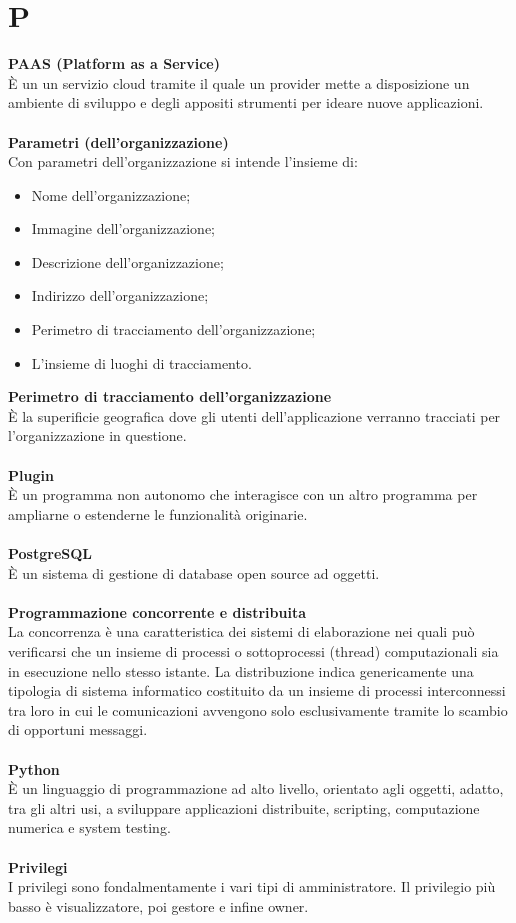 \section{P}
\textbf{PAAS (Platform as a Service)}\\
È un un servizio cloud tramite il quale un provider mette a disposizione un ambiente di sviluppo e degli appositi strumenti per ideare nuove applicazioni. \\ \\
\textbf{Parametri (dell'organizzazione)}\\
Con parametri dell'organizzazione si intende l'insieme di:
\begin{itemize}
    \item Nome dell'organizzazione;
    \item Immagine dell'organizzazione;
    \item Descrizione dell'organizzazione;
    \item Indirizzo dell'organizzazione;
    \item Perimetro di tracciamento dell'organizzazione;
    \item L'insieme di luoghi di tracciamento.\\
\end{itemize} 

\textbf{Perimetro di tracciamento dell'organizzazione}\\
È la superificie geografica dove gli utenti dell'applicazione verranno tracciati per l'organizzazione in questione.\\ \\
\textbf{Plugin}\\
È un programma non autonomo che interagisce con un altro programma per ampliarne o estenderne le funzionalità originarie. \\ \\
\textbf{PostgreSQL}\\
È un sistema di gestione di database open source ad oggetti. \\ \\
\textbf{Programmazione concorrente e distribuita}\\
La concorrenza è una caratteristica dei sistemi di elaborazione nei quali può verificarsi che un insieme di processi o sottoprocessi (thread) computazionali sia in esecuzione nello stesso istante. La distribuzione indica genericamente una tipologia di sistema informatico costituito da un insieme di processi interconnessi tra loro in cui le comunicazioni avvengono solo esclusivamente tramite lo scambio di opportuni messaggi. \\ \\
\textbf{Python}\\
È un linguaggio di programmazione ad alto livello, orientato agli oggetti, adatto, tra gli altri usi, a sviluppare applicazioni distribuite, scripting, computazione numerica e system testing. \\ \\
\textbf{Privilegi}\\
I privilegi sono fondalmentamente i vari tipi di amministratore. Il privilegio più basso è visualizzatore, poi gestore e infine owner. \\ \\
\clearpage
